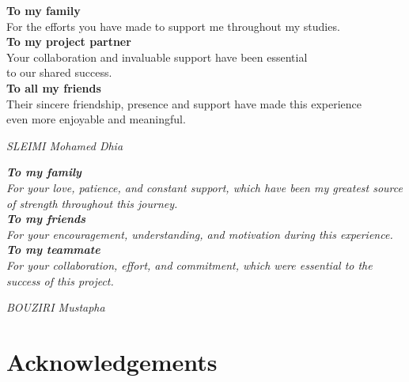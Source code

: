 \documentclass[12pt,a4paper]{report}
\begin{document}
\vspace{0.1em}
\textbf{To my family}\\[0.1em]
For the efforts you have made to support me throughout my studies.\\


\vspace{0.1em}
\textbf{To my project partner}\\[0.1em]
Your collaboration and invaluable support have been essential\\
to our shared success.\\


\vspace{0.1em}
\textbf{To all my friends}\\[0.1em]
Their sincere friendship, presence and support have made this experience\\
even more enjoyable and meaningful.\\
\vspace{1em}
\begin{flushright}
\normalfont\textit{SLEIMI Mohamed Dhia}
\end{flushright}

\vspace{2em}
\itshape
\textbf{To my family}\\[0.1em]
For your love, patience, and constant support, which have been 
my greatest source of strength throughout this journey.\\

\vspace{0.1em}
\textbf{To my friends}\\[0.1em]
For your encouragement, understanding, and motivation during this experience.\\

\vspace{0.1em}
\textbf{To my teammate}\\[0.1em]
For your collaboration, effort, and commitment, which were essential 
to the success of this project.\\
\vspace{1em}
\begin{flushright}
\normalfont\textit{BOUZIRI Mustapha}
\end{flushright}
\newpage


\chapter*{Acknowledgements}
\end{document}
